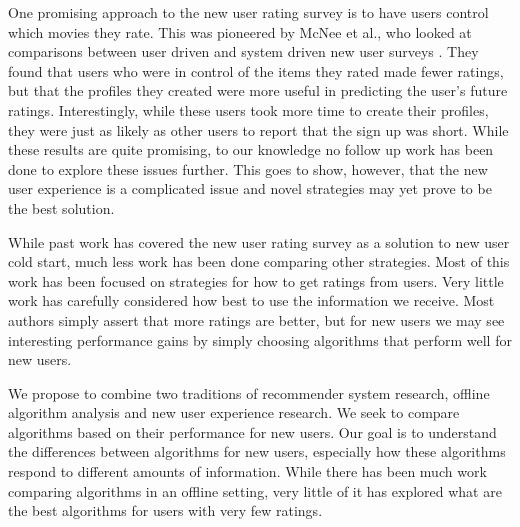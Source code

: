 \documentclass[letterpaper]{sig-alternate}
\begin{document}
  One promising approach to the new user rating survey is to have users control which movies they rate.
  This was pioneered by McNee et al., who looked at comparisons between user driven and system driven new user surveys \cite{mcneeInterfaces}.
  They found that users who were in control of the items they rated made fewer ratings, but that the profiles they created were more useful in predicting the user's future ratings.
  Interestingly, while these users took more time to create their profiles, they were just as likely as other users to report that the sign up was short.
  While these results are quite promising, to our knowledge no follow up work has been done to explore these issues further.
  This goes to show, however, that the new user experience is a complicated issue and novel strategies may yet prove to be the best solution.


  While past work has covered the new user rating survey as a solution to new user cold start, much less work has been done comparing other strategies.
  Most of this work has been focused on strategies for how to get ratings from users.
  Very little work has carefully considered how best to use the information we receive.
  Most authors simply assert that more ratings are better, but for new users we may see interesting performance gains by simply choosing algorithms that perform well for new users.

  We propose to combine two traditions of recommender system research, offline algorithm analysis and new user experience research.
  We seek to compare algorithms based on their performance for new users.
  Our goal is to understand the differences between algorithms for new users, especially how these algorithms respond to different amounts of information.
  While there has been much work comparing algorithms in an offline setting, very little of it has explored what are the best algorithms for users with very few ratings.
\end{document}
